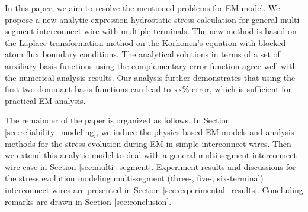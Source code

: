 In this paper, we aim to resolve the mentioned problems for EM
model. We propose a new analytic expression hydrostatic stress
calculation for general multi-segment interconnect wire with multiple
terminals. The new method is based on the Laplace transformation
method on the Korhonen's equation with blocked atom flux boundary
conditions. The analytical solutions in terms of a set of auxiliary
basis functions using the complementary error function agree well with
the numerical analysis results. Our analysis further demonstrates that
using the first two dominant basis functions can lead to xx\% error,
which is sufficient for practical EM analysis.

The remainder of the paper is organized as follows. In Section
\ref{sec:reliability_modeling}, we induce the physics-based EM models
and analysis methods for the stress evolution during EM in simple
interconnect wires. Then we extend this analytic model to deal with a
general multi-segment interconnect wire case in Section
\ref{sec:multi_segment}. Experiment results and discussions for the
stress evolution modeling multi-segment (three-, five-, six-terminal)
interconnect wires are presented in Section
\ref{sec:experimental_results}. Concluding remarks are drawn in
Section \ref{sec:conclusion}.



